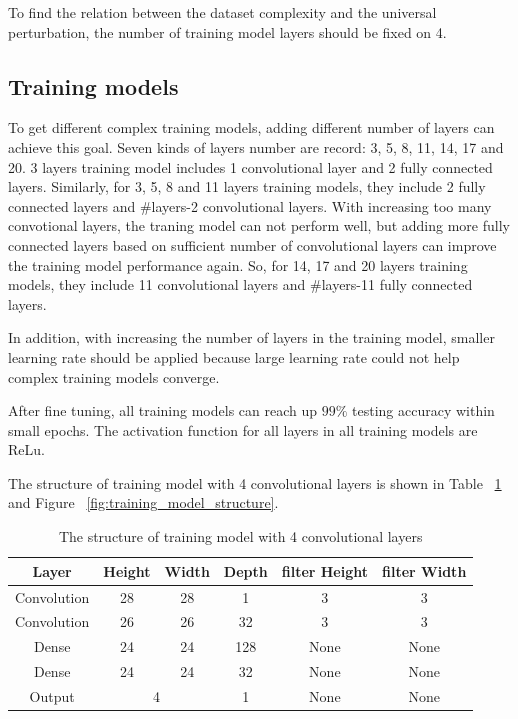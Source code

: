 \documentclass{article}
\begin{document}
To find the relation between the dataset complexity and the universal perturbation, the number of training model layers should be fixed on 4.
\subsection{Training models}

To get different complex training models, adding different number of layers can achieve this goal. Seven kinds of layers number are record: 3, 5, 8, 11, 14, 17 and 20. 3 layers training model includes 1 convolutional layer and 2 fully connected layers. Similarly, for 3, 5, 8 and 11 layers training models, they include 2 fully connected layers and #layers-2 convolutional layers. With increasing too many convotional layers, the traning model can not perform well, but adding more fully connected layers based on sufficient number of convolutional layers can improve the training model performance again. So, for 14, 17 and 20 layers training models, they include 11 convolutional layers and #layers-11 fully connected layers.

In addition, with increasing the number of layers in the training model, smaller learning rate should be applied because large learning rate could not help complex training models converge.

After fine tuning, all training models can reach up $99\%$ testing accuracy within small epochs. The activation function for all layers in all training models are ReLu. 

The structure of training model with 4 convolutional layers is shown in Table ~\ref{table:training_model_structure} and Figure ~\ref{fig:training_model_structure}.

\begin{table}
\begin{center}
\begin{tabular}{ |c|c|c|c|c|c| } 
\hline
Layer & Height & Width & Depth & filter Height & filter Width \\
\hline
Convolution & 28 & 28 & 1 & 3 & 3 \\ 
\hline
Convolution & 26 & 26 & 32 & 3 & 3 \\ 
\hline
Dense & 24 & 24 & 128 & None & None \\ 
\hline
Dense & 24 & 24 & 32 & None & None \\ 
\hline
Output & \multicolumn{2}{c}{4} & 1 & None & None \\ 
\hline
\end{tabular}
\end{center}
\caption{The structure of training model with 4 convolutional layers}
\label{table:training_model_structure}
\end{table}
\end{document}
